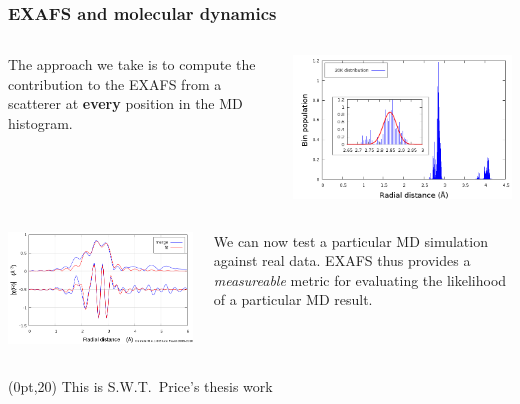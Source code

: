 \documentclass[10pt, xcolor=x11names, compress, handout]{beamer}
\begin{document}
\begin{frame}
  \frametitle{EXAFS and molecular dynamics}
  
  \begin{columns}
    \begin{column}{0.5\linewidth}
      The approach we take is to compute the contribution to the EXAFS
      from a scatterer at \textbf{every} position in the MD histogram.
    \end{column}
    \begin{column}{0.5\linewidth}
      \includegraphics[width=\linewidth]{JM/histogram.png}
    \end{column}
  \end{columns}
  \begin{columns}
    \begin{column}{0.5\linewidth}
      \includegraphics[width=\linewidth]{JM/histo_fit_withss.png}
    \end{column}
    \begin{column}{0.5\linewidth}
      We can now test a particular MD simulation against real data.
      EXAFS thus provides a \textit{measureable} metric for evaluating
      the likelihood of a particular MD result.
    \end{column}
  \end{columns}
  \begin{textblock*}{0.6\linewidth}(0pt,20\TPVertModule)
    \tiny This is S.W.T.\ Price's thesis work
  \end{textblock*}
\end{frame}
\end{document}
